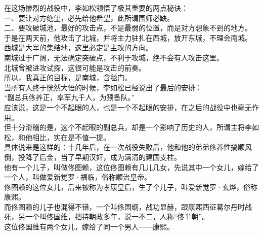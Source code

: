 \begin{multicols}{\theparacolNo}
在这场惨烈的战役中，李如松领悟了极其重要的两点秘诀：\\

一、要让对方绝望，必先给他希望，此所谓围师必缺。\\

二、要攻破城池，最好的攻击点，不是最弱的位置，而是对方想象不到的地方。\\

于是在两天前，他攻击了北城，并将主力驻扎在西城，放开东城，不理会南城。\\

西城是大军的集结地，这里必定是主攻的方向。\\

南城过于广阔，无法确定突破点，不利于攻城，绝不会有人攻击这里。\\

北城曾被进攻试探，这很可能是攻击的前奏。\\

所以，我真正的目标，是南城，含毯门。\\

当所有人终于恍然大悟的时候，李如松已经说出了最后的安排：\\

“副总兵佟养正，率军九千人，为预备队。”\\

应该说，这是一个不起眼的人，也是一个不起眼的安排，在之后的战役中也毫无作用。\\

但十分滑稽的是，这个不起眼的副总兵，却是一个影响了历史的人，所谓主将李如松，和他相比，实在是不值一提。\\

具体说来是这样的：十几年后，在一次战役失败后，他和他的弟弟佟养性搞顺风倒，投降了后金，当了早期汉奸，成为满清的建国支柱。\\

他有一个儿子，叫做佟图赖，这位佟图赖有几儿几女，先说其中一个女儿，嫁给了一个人，叫做爱新觉罗·福临，俗称顺治皇帝。\\

佟图赖的这位女儿，后来被称为孝康皇后，生了个儿子，叫爱新觉罗·玄烨，俗称康熙。\\

而佟图赖的儿子也混得不错，一个叫佟国纲，战功显赫，跟康熙西征葛尔丹时战死，另一个叫佟国维，把持朝政多年，说一不二，人称“佟半朝”。\\

这位佟国维有两个女儿，嫁给了同一个男人——康熙。\\


\end{multicols}
